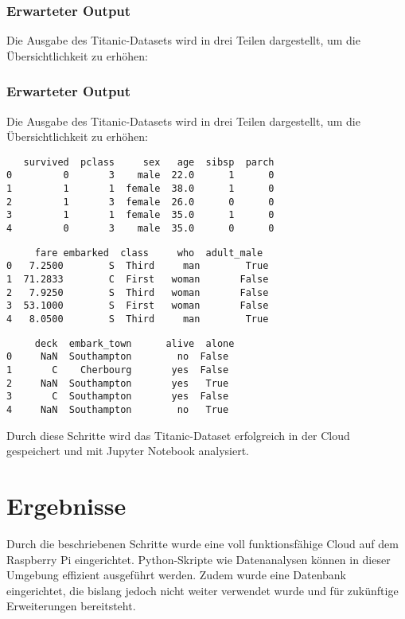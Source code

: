 \documentclass[a4paper,12pt]{article}
\begin{document}
\subsubsection{Erwarteter Output}
Die Ausgabe des Titanic-Datasets wird in drei Teilen dargestellt, um die Übersichtlichkeit zu erhöhen:

\subsubsection{Erwarteter Output}
Die Ausgabe des Titanic-Datasets wird in drei Teilen dargestellt, um die Übersichtlichkeit zu erhöhen:

\begin{lstlisting}
   survived  pclass     sex   age  sibsp  parch  
0         0       3    male  22.0      1      0  
1         1       1  female  38.0      1      0  
2         1       3  female  26.0      0      0  
3         1       1  female  35.0      1      0  
4         0       3    male  35.0      0      0  
\end{lstlisting}

\begin{lstlisting}
     fare embarked  class     who  adult_male  
0   7.2500        S  Third     man        True  
1  71.2833        C  First   woman       False  
2   7.9250        S  Third   woman       False  
3  53.1000        S  First   woman       False  
4   8.0500        S  Third     man        True  
\end{lstlisting}

\begin{lstlisting}
     deck  embark_town      alive  alone  
0     NaN  Southampton        no  False  
1       C    Cherbourg       yes  False  
2     NaN  Southampton       yes   True  
3       C  Southampton       yes  False  
4     NaN  Southampton        no   True  
\end{lstlisting}

\noindent
Durch diese Schritte wird das Titanic-Dataset erfolgreich in der Cloud gespeichert und mit Jupyter Notebook analysiert.


\section{Ergebnisse}
Durch die beschriebenen Schritte wurde eine voll funktionsfähige Cloud auf dem Raspberry Pi eingerichtet. Python-Skripte wie Datenanalysen können in dieser Umgebung effizient ausgeführt werden. Zudem wurde eine Datenbank eingerichtet, die bislang jedoch nicht weiter verwendet wurde und für zukünftige Erweiterungen bereitsteht.
\end{document}
